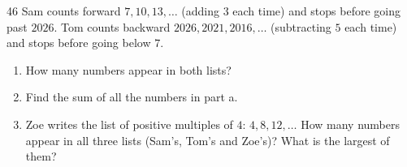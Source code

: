 \begin{probbox}{46}{}
Sam counts forward $7, 10, 13,\dots$ (adding $3$ each time) and stops before going past $2026$. Tom counts backward $2026, 2021, 2016,\dots$ (subtracting $5$ each time) and stops before going below $7$.
\begin{enumerate}[label=\alph*),leftmargin=1.6em,itemsep=1pt]
\item How many numbers appear in both lists?
\item Find the sum of all the numbers in part a.
\item Zoe writes the list of positive multiples of $4$: $4, 8, 12,\dots$ How many numbers appear in all three lists (Sam's, Tom's and Zoe's)? What is the largest of them?
\end{enumerate}
\end{probbox}
